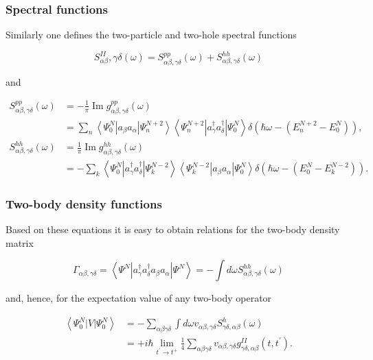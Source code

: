 \documentclass[compress]{beamer}
\begin{document}
\frame
{
\frametitle{Spectral functions}
\begin{small}
{\scriptsize
Similarly one defines the two-particle and two-hole spectral functions

$$
S_{\alpha \beta}^{I I}, \gamma \delta(\omega)=S_{\alpha \beta, \gamma \delta}^{p p}(\omega)+S_{\alpha \beta, \gamma \delta}^{h h}(\omega)
$$

and

$$
\begin{aligned}
S_{\alpha \beta, \gamma \delta}^{p p}(\omega) & =-\frac{1}{\pi} \operatorname{Im} g_{\alpha \beta, \gamma \delta}^{p p}(\omega) \\
& =\sum_{n}\left\langle\Psi_{0}^{N}\left|a_{\beta} a_{\alpha}\right| \Psi_{n}^{N+2}\right\rangle\left\langle\Psi_{n}^{N+2}\left|a_{\gamma}^{\dagger} a_{\delta}^{\dagger}\right| \Psi_{0}^{N}\right\rangle \delta\left(\hbar \omega-\left(E_{n}^{N+2}-E_{0}^{N}\right)\right), \\
S_{\alpha \beta, \gamma \delta}^{h h}(\omega) & =\frac{1}{\pi} \operatorname{Im} g_{\alpha \beta, \gamma \delta}^{h h}(\omega) \\
& =-\sum_{k}\left\langle\Psi_{0}^{N}\left|a_{\gamma}^{\dagger} a_{\delta}^{\dagger}\right| \Psi_{k}^{N-2}\right\rangle\left\langle\Psi_{k}^{N-2}\left|a_{\beta} a_{\alpha}\right| \Psi_{0}^{N}\right\rangle \delta\left(\hbar \omega-\left(E_{0}^{N}-E_{k}^{N-2}\right)\right) .
\end{aligned}
$$

}
\end{small}
}
\frame
{
\frametitle{Two-body density functions}
\begin{small}
{\scriptsize
Based on these equations it is easy to obtain relations for the two-body density matrix

$$
\Gamma_{\alpha \beta, \gamma \delta}=\left\langle\Psi^{N}\left|a_{\gamma}^{\dagger} a_{\delta}^{\dagger} a_{\beta} a_{\alpha}\right| \Psi^{N}\right\rangle=-\int d \omega S_{\alpha \beta, \gamma \delta}^{h h}(\omega)
$$

and, hence, for the expectation value of any two-body operator

$$
\begin{aligned}
\left\langle\Psi_{0}^{N}|V| \Psi_{0}^{N}\right\rangle & =-\sum_{\alpha \beta \gamma \delta} \int d \omega v_{\alpha \beta, \gamma \delta} S_{\gamma \delta, \alpha \beta}^{h}(\omega) \\
& =+i \hbar \lim _{t^{\prime} \rightarrow t^{+}} \frac{1}{4} \sum_{\alpha \beta \gamma \delta} v_{\alpha \beta, \gamma \delta} g_{\gamma \delta, \alpha \beta}^{I I}\left(t, t^{\prime}\right) .
\end{aligned}
$$

}
\end{small}
}
\end{document}
